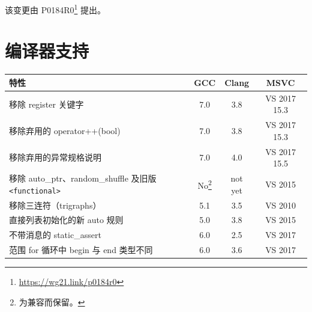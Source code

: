 \begin{myInfoBox}
该变更由 P0184R0\footnote{\url{https://wg21.link/p0184r0}} 提出。
\end{myInfoBox}

\section{编译器支持}

\begin{table}[H]
\centering
\begin{tabularx}{\textwidth}{X c c c}
\toprule
特性 & GCC & Clang & MSVC \\
\midrule
移除 register 关键字 & 7.0 & 3.8 & VS 2017 15.3 \\
移除弃用的 operator++(bool) & 7.0 & 3.8 & VS 2017 15.3 \\
移除弃用的异常规格说明 & 7.0 & 4.0 & VS 2017 15.5 \\
移除 auto\_ptr、random\_shuffle 及旧版 \texttt{<functional>} & No\footnote{为兼容而保留。} & not yet & VS 2015 \\
移除三连符（trigraphs） & 5.1 & 3.5 & VS 2010 \\
直接列表初始化的新 auto 规则 & 5.0 & 3.8 & VS 2015 \\
不带消息的 static\_assert & 6.0 & 2.5 & VS 2017 \\
范围 for 循环中 begin 与 end 类型不同 & 6.0 & 3.6 & VS 2017 \\
\bottomrule
\end{tabularx}
\end{table}
